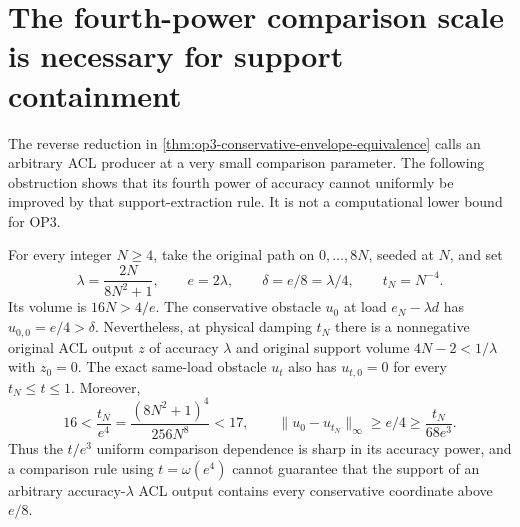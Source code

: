 \section{The fourth-power comparison scale is necessary for support containment}
\label{sec:op3-conservative-parameter-obstruction}

The reverse reduction in
\cref{thm:op3-conservative-envelope-equivalence} calls an arbitrary ACL
producer at a very small comparison parameter. The following obstruction
shows that its fourth power of accuracy cannot uniformly be improved by
that support-extraction rule. It is not a computational lower bound for OP3.

\begin{theorem}
\label{thm:op3-fourth-power-support-obstruction}
For every integer $N\geq4$, take the original path on $0,\ldots,8N$,
seeded at $N$, and set
\[
 \lambda=\frac{2N}{8N^2+1},\qquad e=2\lambda,\qquad
 \delta=e/8=\lambda/4,\qquad t_N=N^{-4}.
\]
Its volume is $16N>4/e$. The conservative obstacle $u_0$ at load
$e_N-\lambda d$ has $u_{0,0}=e/4>\delta$. Nevertheless, at physical
damping $t_N$ there is a nonnegative original ACL output $z$ of accuracy
$\lambda$ and original support volume $4N-2<1/\lambda$ with $z_0=0$.
The exact same-load obstacle $u_t$ also has $u_{t,0}=0$ for every
$t_N\leq t\leq1$. Moreover,
\[
 16<\frac{t_N}{e^4}
 =\frac{(8N^2+1)^4}{256N^8}<17,
 \qquad
 \|u_0-u_{t_N}\|_\infty\geq e/4
 \geq\frac{t_N}{68e^3}.
\]
Thus the $t/e^3$ uniform comparison dependence is sharp in its accuracy
power, and a comparison rule using $t=\omega(e^4)$ cannot guarantee that
the support of an arbitrary accuracy-$\lambda$ ACL output contains every
conservative coordinate above $e/8$.
\end{theorem}
